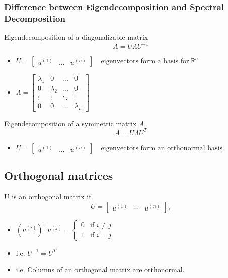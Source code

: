 \subsubsection{Difference between Eigendecomposition and Spectral Decomposition}
\begin{definition}
    Eigendecomposition of a diagonalizable matrix
    \[
    A = U \Lambda U^{-1}
    \]
    \begin{itemize}
        \item $U = \begin{bmatrix}
    u^{(1)} & \dots & u^{(n)}
    \end{bmatrix}
    \quad \text{eigenvectors form a basis for} \ \mathbb{R}^n$
    \item $\Lambda = \begin{bmatrix}
    \lambda_1 & 0 & \dots & 0 \\
    0 & \lambda_2 & \dots & 0 \\
    \vdots & \vdots & \ddots & \vdots \\
    0 & 0 & \dots & \lambda_n
    \end{bmatrix}$
    \end{itemize}
    \vspace{1em}

    Eigendecomposition of a symmetric matrix $A$
    \[
    A = U \Lambda U^T
    \]
    \begin{itemize}
        \item $U = \begin{bmatrix}
            u^{(1)} & \dots & u^{(n)}
            \end{bmatrix}
            \quad \text{eigenvectors form an orthonormal basis}$
    \end{itemize}  
\end{definition}

\subsection{Orthogonal matrices}
\begin{definition}
    U is an orthogonal matrix if
    \[
    U = \begin{bmatrix}
    u^{(1)} & \cdots & u^{(n)}
    \end{bmatrix},
    \]
    \begin{itemize}
        \item $
    (u^{(i)})^\top u^{(j)} = 
    \begin{cases} 
    0 & \text{if } i \neq j \\
    1 & \text{if } i = j
    \end{cases}$
    \item i.e. $U^{-1} = U^T$
    \item i.e. Columns of an orthogonal matrix are orthonormal.
    \end{itemize}
\end{definition}

